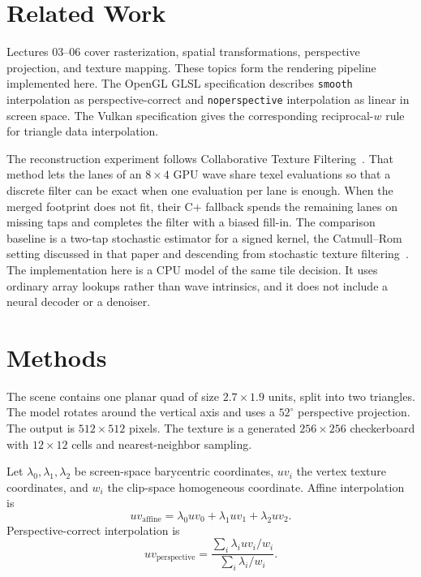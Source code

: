\documentclass[a4paper,11pt]{article}
\begin{document}
\section{Related Work}
Lectures 03--06 cover rasterization, spatial transformations, perspective projection, and texture mapping. These topics form the rendering pipeline implemented here. The OpenGL GLSL specification describes \texttt{smooth} interpolation as perspective-correct and \texttt{noperspective} interpolation as linear in screen space. The Vulkan specification gives the corresponding reciprocal-$w$ rule for triangle data interpolation.

The reconstruction experiment follows Collaborative Texture Filtering~\cite{ctf}. That method lets the lanes of an $8\times4$ GPU wave share texel evaluations so that a discrete filter can be exact when one evaluation per lane is enough. When the merged footprint does not fit, their C+ fallback spends the remaining lanes on missing taps and completes the filter with a biased fill-in. The comparison baseline is a two-tap stochastic estimator for a signed kernel, the Catmull--Rom setting discussed in that paper and descending from stochastic texture filtering~\cite{stf}. The implementation here is a CPU model of the same tile decision. It uses ordinary array lookups rather than wave intrinsics, and it does not include a neural decoder or a denoiser.

\section{Methods}
The scene contains one planar quad of size $2.7\times1.9$ units, split into two triangles. The model rotates around the vertical axis and uses a $52^\circ$ perspective projection. The output is $512\times512$ pixels. The texture is a generated $256\times256$ checkerboard with $12\times12$ cells and nearest-neighbor sampling.

Let $\lambda_0,\lambda_1,\lambda_2$ be screen-space barycentric coordinates, $uv_i$ the vertex texture coordinates, and $w_i$ the clip-space homogeneous coordinate. Affine interpolation is
\begin{equation}
uv_{\mathrm{affine}}=\lambda_0uv_0+\lambda_1uv_1+\lambda_2uv_2.
\end{equation}
Perspective-correct interpolation is
\begin{equation}
uv_{\mathrm{perspective}}=
\frac{\sum_i\lambda_i uv_i/w_i}{\sum_i\lambda_i/w_i}.
\end{equation}
\end{document}
